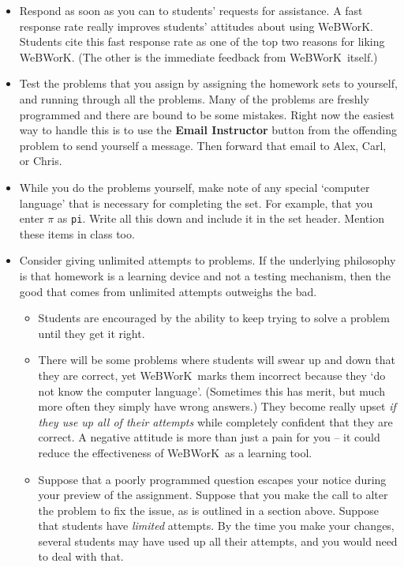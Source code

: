 \documentclass[12pt]{article}
\newcommand{\menu}[1]{\textbf{#1}}
\newcommand{\WW}{WeBWorK}
\begin{document}
\begin{itemize}
	\item Respond as soon as you can to students' requests for assistance.
	      A fast response rate really improves students' attitudes about using \WW.
	      Students cite this fast response rate as one of the top two reasons for liking \WW.
	      (The other is the immediate feedback from \WW\ itself.)

	\item Test the problems that you assign by assigning the homework sets to yourself, and running through all the problems.
	      Many of the problems are freshly programmed and there are bound to be some mistakes.
	      Right now the easiest way to handle this is to use the \menu{Email Instructor} button from the offending problem to send yourself a message.
	      Then forward that email to Alex, Carl, or Chris.

	\item While you do the problems yourself, make note of any special `computer language' that is necessary for completing the set.
	      For example, that you enter $\pi$ as \texttt{pi}.
	      Write all this down and include it in the set header.
	      Mention these items in class too.

	\item Consider giving unlimited attempts to problems.
	      If the underlying philosophy is that homework is a learning device and not a testing mechanism, then the good that comes from unlimited attempts outweighs the bad.
	      \begin{itemize}
		      \item Students are encouraged by the ability to keep trying to solve a problem until they get it right.

		      \item There will be some problems where students will swear up and down that they are correct, yet \WW\ marks them incorrect because they `do not know the computer language'.  (Sometimes this has merit, but much more often they simply have wrong answers.)  They become really upset \emph{if they use up all of their attempts} while completely confident that they are correct.
		            A negative attitude is more than just a pain for you -- it could reduce the effectiveness of \WW\ as a learning tool.

		      \item Suppose that a poorly programmed question escapes your notice during your preview of the assignment.
		            Suppose that you make the call to alter the problem to fix the issue, as is outlined in a section above.
		            Suppose that students have \emph{limited} attempts.
		            By the time you make your changes, several students may have used up all their attempts, and you would need to deal with that.


\end{itemize}
\end{itemize}
\end{document}
